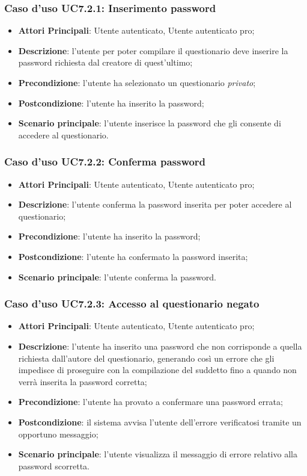 \subsubsection{Caso d'uso UC7.2.1: Inserimento password}
\begin{itemize}
\item\textbf{Attori Principali}: Utente autenticato, Utente autenticato pro;
\item\textbf{Descrizione}: l'utente per poter compilare il questionario deve inserire la password richiesta dal creatore di quest'ultimo;
\item\textbf{Precondizione}: l'utente ha selezionato un questionario \textit{privato};
\item\textbf{Postcondizione}: l'utente ha inserito la password;
\item\textbf{Scenario principale}: l'utente inserisce la password che gli consente di accedere al questionario.
\end{itemize}

\subsubsection{Caso d'uso UC7.2.2: Conferma password}
\begin{itemize}
\item\textbf{Attori Principali}: Utente autenticato, Utente autenticato pro;
\item\textbf{Descrizione}: l'utente conferma la password inserita per poter accedere al questionario;
\item\textbf{Precondizione}: l'utente ha inserito la password;
\item\textbf{Postcondizione}: l'utente ha confermato la password inserita;
\item\textbf{Scenario principale}: l'utente conferma la password.
\end{itemize}

\subsubsection{Caso d'uso UC7.2.3: Accesso al questionario negato}
\begin{itemize}
\item\textbf{Attori Principali}: Utente autenticato, Utente autenticato pro;
\item\textbf{Descrizione}: l'utente ha inserito una password che non corrisponde a quella richiesta dall'autore del questionario, generando così un errore che gli impedisce di proseguire con la compilazione del suddetto fino a quando non verrà inserita la password corretta;
\item\textbf{Precondizione}: l'utente ha provato a confermare una password errata;
\item\textbf{Postcondizione}: il sistema avvisa l'utente dell'errore verificatosi tramite un opportuno messaggio;
\item\textbf{Scenario principale}: l'utente visualizza il messaggio di errore relativo alla password scorretta.
\end{itemize}

